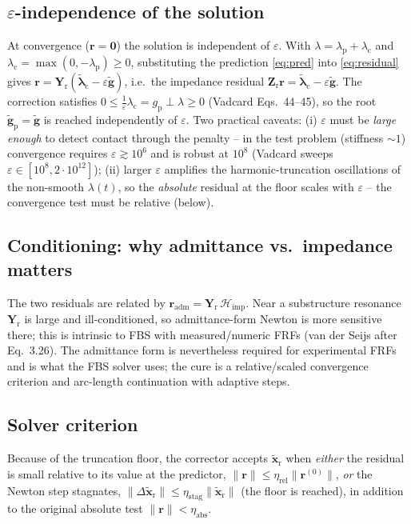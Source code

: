 \documentclass[11pt]{article}
\newcommand{\xr}{\tilde{\bm{x}}_{\mathrm r}}      %
\newcommand{\lamt}{\tilde{\bm{\lambda}}}          %
\newcommand{\Yr}{\bm{Y}_{\mathrm r}}
\newcommand{\Zr}{\bm{Z}_{\mathrm r}}
\begin{document}
\subsection{$\varepsilon$-independence of the solution}
At convergence ($\bm r=\bm0$) the solution is independent of
$\varepsilon$. With $\lambda=\lambda_{\mathrm p}+\lambda_{\mathrm c}$ and
$\lambda_{\mathrm c}=\max(0,-\lambda_{\mathrm p})\ge0$, substituting the
prediction \eqref{eq:pred} into \eqref{eq:residual} gives
$\bm r=\Yr(\lamt_{\mathrm c}-\varepsilon\tilde{\bm g})$, i.e.\ the impedance
residual $\Zr\bm r=\lamt_{\mathrm c}-\varepsilon\tilde{\bm g}$. The
correction satisfies $0\le\tfrac1\varepsilon\lambda_{\mathrm c}=g_{\mathrm p}\perp\lambda\ge0$
(Vadcard Eqs.~44--45), so the root $\tilde{\bm g}_{\mathrm p}=\tilde{\bm g}$
is reached independently of $\varepsilon$. Two practical caveats:
(i) $\varepsilon$ must be \emph{large enough} to detect contact through the
penalty -- in the test problem (stiffness $\sim1$) convergence requires
$\varepsilon\gtrsim10^{6}$ and is robust at $10^{8}$ (Vadcard sweeps
$\varepsilon\in[10^{8},2\!\cdot\!10^{12}]$); (ii) larger $\varepsilon$
amplifies the harmonic-truncation oscillations of the non-smooth
$\lambda(t)$, so the \emph{absolute} residual at the floor scales with
$\varepsilon$ -- the convergence test must be relative (below).

\subsection{Conditioning: why admittance vs.\ impedance matters}
\label{sec:cond-number}
The two residuals are related by $\bm r_{\mathrm{adm}}=\Yr\,\mathcal H_{\mathrm{imp}}$.
Near a substructure resonance $\Yr$ is large and ill-conditioned, so
admittance-form Newton is more sensitive there; this is intrinsic to FBS
with measured/numeric FRFs (van der Seijs after Eq.~3.26). The admittance
form is nevertheless required for experimental FRFs and is what the FBS
solver uses; the cure is a relative/scaled convergence criterion and arc-length
continuation with adaptive steps.

\subsection{Solver criterion}
Because of the truncation floor, the corrector accepts $\xr$ when
\emph{either} the residual is small relative to its value at the predictor,
$\|\bm r\|\le\eta_{\mathrm{rel}}\|\bm r^{(0)}\|$, \emph{or} the Newton step
stagnates, $\|\Delta\xr\|\le\eta_{\mathrm{stag}}\|\xr\|$ (the floor is
reached), in addition to the original absolute test
$\|\bm r\|<\eta_{\mathrm{abs}}$.
\end{document}
